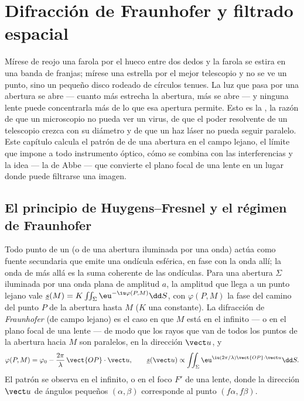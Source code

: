 \chapter{Difracción de Fraunhofer y filtrado espacial}\label{ch:b2:diffraction}

Mírese de reojo una farola por el hueco entre dos dedos y la farola se
estira en una banda de franjas; mírese una estrella por el mejor
telescopio y no se ve un punto, sino un pequeño disco rodeado de círculos
tenues. La luz que pasa por una abertura se abre --- cuanto más estrecha
la abertura, más se abre --- y ninguna lente puede concentrarla más de lo
que esa apertura permite. Esto es la \emph{}, la razón de que un
microscopio no pueda ver un virus, de que el poder resolvente de un
telescopio crezca con su diámetro y de que un haz láser no pueda seguir
paralelo. Este capítulo calcula el patrón de  de una abertura en
el campo lejano, el límite que impone a todo instrumento óptico, cómo se
combina con las interferencias y la idea --- la de Abbe --- que convierte
el plano focal de una lente en un lugar donde puede filtrarse una imagen.

\section{El principio de Huygens--Fresnel y el régimen de Fraunhofer}

\begin{definition}\label{def:b2:diffraction:huygens}
Todo punto de un  (o de una abertura iluminada por una onda) actúa como
fuente secundaria que emite una ondícula esférica, en fase con la onda
allí; la onda de más allá es la suma coherente de las ondículas. Para una
abertura $\Sigma$ iluminada por una onda plana de amplitud $a$, la amplitud
que llega a un punto lejano vale $\underline s(M) = K\iint_\Sigma\eu^{-\iu\varphi(P, M)}\dd S$, con
$\varphi(P, M)$ la fase del camino del punto $P$ de la abertura hasta $M$
($K$ una constante). La difracción de \emph{Fraunhofer} (de campo lejano) es el caso
en que $M$ está en el infinito --- o en el plano focal de una lente --- de modo que
los rayos que van de todos los puntos de la abertura hacia $M$ son paralelos, en
la dirección $\vect u$, y
\[
\varphi(P, M) = \varphi_0 - \frac{2\pi}\lambda\,\vect{OP}\cdot\vect u , \qquad
\underline s(\vect u) \propto \iint_\Sigma\eu^{\iu(2\pi/\lambda)\vect{OP}\cdot\vect u}\dd S .
\]
El patrón se observa en el infinito, o en el foco $F'$ de una lente,
donde la dirección $\vect u$ de ángulos pequeños $(\alpha, \beta)$ corresponde al
punto $(f\alpha, f\beta)$.
\end{definition}
\admitted

